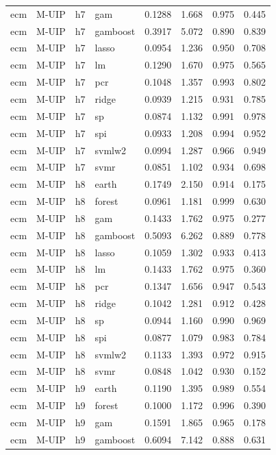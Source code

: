 \begin{ThreePartTable}
\begin{longtable}[t]{llclcccc}
ecm & M-UIP & h7 & gam & 0.1288 & 1.668 & 0.975 & 0.445\\
ecm & M-UIP & h7 & gamboost & 0.3917 & 5.072 & 0.890 & 0.839\\
ecm & M-UIP & h7 & lasso & 0.0954 & 1.236 & 0.950 & 0.708\\
ecm & M-UIP & h7 & lm & 0.1290 & 1.670 & 0.975 & 0.565\\
ecm & M-UIP & h7 & pcr & 0.1048 & 1.357 & 0.993 & 0.802\\
ecm & M-UIP & h7 & ridge & 0.0939 & 1.215 & 0.931 & 0.785\\
ecm & M-UIP & h7 & sp & 0.0874 & 1.132 & 0.991 & 0.978\\
ecm & M-UIP & h7 & spi & 0.0933 & 1.208 & 0.994 & 0.952\\
ecm & M-UIP & h7 & svmlw2 & 0.0994 & 1.287 & 0.966 & 0.949\\
ecm & M-UIP & h7 & svmr & 0.0851 & 1.102 & 0.934 & 0.698\\
\addlinespace
ecm & M-UIP & h8 & earth & 0.1749 & 2.150 & 0.914 & 0.175\\
ecm & M-UIP & h8 & forest & 0.0961 & 1.181 & 0.999 & 0.630\\
ecm & M-UIP & h8 & gam & 0.1433 & 1.762 & 0.975 & 0.277\\
ecm & M-UIP & h8 & gamboost & 0.5093 & 6.262 & 0.889 & 0.778\\
ecm & M-UIP & h8 & lasso & 0.1059 & 1.302 & 0.933 & 0.413\\
ecm & M-UIP & h8 & lm & 0.1433 & 1.762 & 0.975 & 0.360\\
ecm & M-UIP & h8 & pcr & 0.1347 & 1.656 & 0.947 & 0.543\\
ecm & M-UIP & h8 & ridge & 0.1042 & 1.281 & 0.912 & 0.428\\
ecm & M-UIP & h8 & sp & 0.0944 & 1.160 & 0.990 & 0.969\\
ecm & M-UIP & h8 & spi & 0.0877 & 1.079 & 0.983 & 0.784\\
ecm & M-UIP & h8 & svmlw2 & 0.1133 & 1.393 & 0.972 & 0.915\\
ecm & M-UIP & h8 & svmr & 0.0848 & 1.042 & 0.930 & 0.152\\
\addlinespace
ecm & M-UIP & h9 & earth & 0.1190 & 1.395 & 0.989 & 0.554\\
ecm & M-UIP & h9 & forest & 0.1000 & 1.172 & 0.996 & 0.390\\
ecm & M-UIP & h9 & gam & 0.1591 & 1.865 & 0.965 & 0.178\\
ecm & M-UIP & h9 & gamboost & 0.6094 & 7.142 & 0.888 & 0.631\\

\end{longtable}
\end{ThreePartTable}
